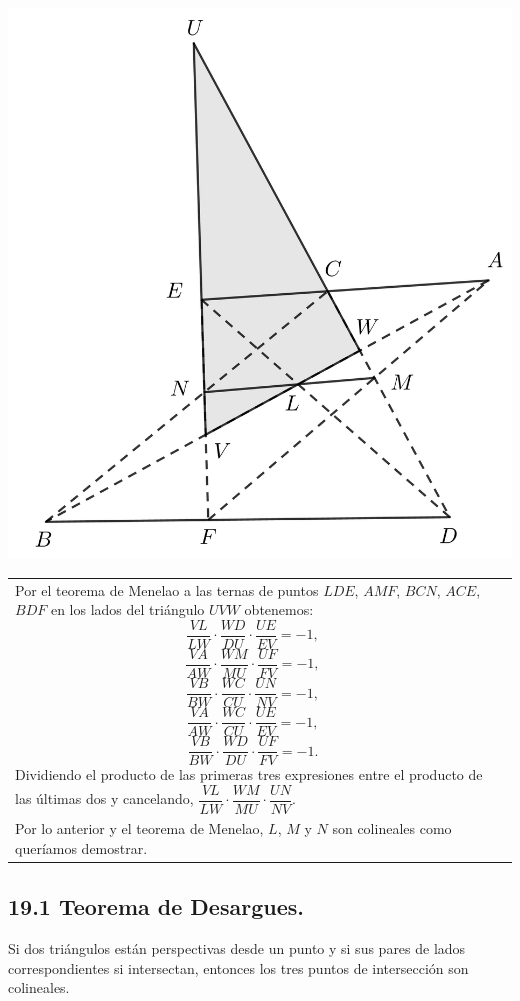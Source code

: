 \documentclass[12pt,a4paper]{article}
\begin{document}
\begin{center}
\includegraphics[scale=0.48]{Imagenes/pappus2.png} 
\end{center}
\newpage
\begin{tabular}{p{15.9 cm} p{1cm}}
Por el teorema de Menelao a las ternas de puntos $LDE$, $AMF$, $BCN$, $ACE$, $BDF$ en los lados del triángulo $UVW$ obtenemos:
$$\dfrac{VL}{LW}\cdot \dfrac{WD}{DU}\cdot \dfrac{UE}{EV}=-1,$$
$$\dfrac{VA}{AW}\cdot \dfrac{WM}{MU}\cdot \dfrac{UF}{FV}=-1,$$
$$\dfrac{VB}{BW}\cdot \dfrac{WC}{CU}\cdot \dfrac{UN}{NV}=-1,$$
$$\dfrac{VA}{AW}\cdot \dfrac{WC}{CU}\cdot \dfrac{UE}{EV}=-1,$$
$$\dfrac{VB}{BW}\cdot \dfrac{WD}{DU}\cdot \dfrac{UF}{FV}=-1.$$
Dividiendo el producto de las primeras tres expresiones entre el producto de las últimas dos y cancelando, $\dfrac{VL}{LW} \cdot \dfrac{WM}{MU} \cdot \dfrac{UN}{NV}.$
\\Por lo anterior y el teorema de Menelao, $L$, $M$ y $N$ son colineales como queríamos demostrar.

\end{tabular}
\subsection*{19.1 Teorema de Desargues.}
Si dos triángulos están perspectivas desde un punto y si sus pares de lados correspondientes si intersectan, entonces los tres puntos de intersección son colineales.
\end{document}
